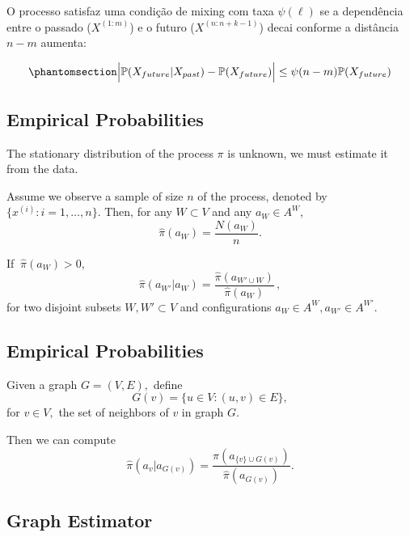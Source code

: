 \documentclass[
  english,
  letterpaper,
  DIV=11,
  numbers=noendperiod]{scrartcl}
\begin{document}
O processo satisfaz uma condição de mixing com taxa \(\psi(\ell)\) se a
dependência entre o passado (\(X^{(1:m)}\)) e o futuro
(\(X^{(n:n+k-1)}\)) decai conforme a distância \(n-m\) aumenta:

\begin{equation}\phantomsection\label{eq-mixing}{
\Bigl| \mathbb P (X_{future} | X_{past}) - \mathbb P (X_{future}) \Bigr| \leq \psi(n-m) \mathbb P(X_{future})
}\end{equation}

\subsection{Empirical Probabilities}\label{empirical-probabilities}

The stationary distribution of the process \(\pi\) is unknown, we must
estimate it from the data.

Assume we observe a sample of size \(n\) of the process, denoted by
\(\{x^{(i)}\colon i=1,\dots,n\}\). Then, for any \(W\subset V\) and any
\(a_W\in A^{W}\), \begin{equation*}
    \widehat{\pi}(a_W)  = \frac{N(a_W)}{n}.
\end{equation*}

If \(\:\widehat\pi(a_W)>0\), \begin{equation*}
    \widehat\pi(a_{W'}|a_{W})  = \frac{\widehat\pi(a_{W'\cup W})}{\widehat\pi(a_{W})}\,,
\end{equation*} for two disjoint subsets \(W,W'\subset V\) and
configurations \(a_W\in A^W, a_{W'}\in A^{W'}\).

\subsection{Empirical Probabilities}\label{empirical-probabilities-1}

Given a graph \(G=(V,E),\) define
\[G(v) = \big\{u \in V: (u,v) \in E \big\},\] for \(v \in V,\) the set
of neighbors of \(v\) in graph \(G.\)

Then we can compute \begin{equation*}
    \widehat\pi(a_v|a_{G(v)})  = \frac{\widehat\pi(a_{\{v\}\cup G(v)})}{\widehat\pi(a_{G(v)})}.
\end{equation*}

\subsection{Graph Estimator}\label{graph-estimator}
\end{document}
